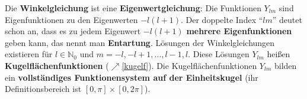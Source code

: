    Die \textbf{Winkelgleichung} ist eine \textbf{Eigenwertgleichung}: Die Funktionen $Y_{lm}$ sind Eigenfunktionen zu den Eigenwerten $-l(l+1)$.
   Der doppelte Index \enquote{$lm$} deutet schon an, dass es zu jedem Eigenwert $-l(l+1)$ \textbf{mehrere Eigenfunktionen} geben kann, das nennt man \textbf{Entartung}. Lösungen der Winkelgleichungen existieren für $l \in \mathbb{N}_0$ und $m = -l, -l+1, \dots, l-1, l$. Diese Lösungen $Y_{lm}$ heißen \textbf{Kugelflächenfunktionen} ($\nearrow$\ref{kugelf}).
   Die Kugelflächenfunktionen $Y_{lm}$ bilden ein \textbf{vollständiges Funktionensystem auf der Einheitskugel} (ihr Definitionsbereich ist $[0,\pi] \times [0,2\pi]$).